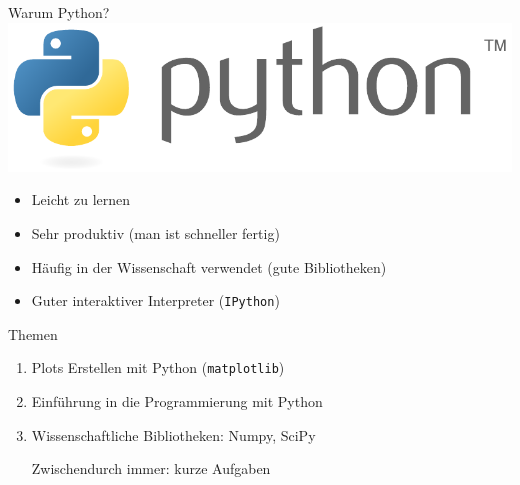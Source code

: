
\begin{frame}{Warum Python?}
  \includegraphics[width=\textwidth]{logos/python.pdf}
  \begin{itemize}
    \item Leicht zu lernen
    \item Sehr produktiv (man ist schneller fertig)
    \item Häufig in der Wissenschaft verwendet (gute Bibliotheken)
    \item Guter interaktiver Interpreter (\texttt{IPython})
  \end{itemize}
\end{frame}

\begin{frame}{Themen}
  \begin{enumerate}
    \item {\large Plots Erstellen mit Python (\texttt{matplotlib})}
    \item {\large Einführung in die Programmierung mit Python}
    \item {\large Wissenschaftliche Bibliotheken: Numpy, SciPy}

    Zwischendurch immer: kurze Aufgaben
  \end{enumerate}
\end{frame}

